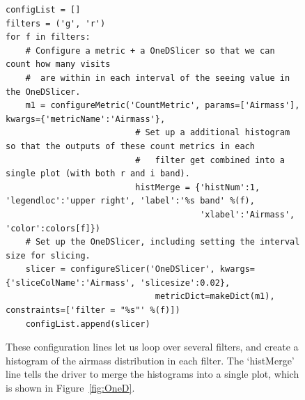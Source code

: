 \documentclass[]{spie}  %
\begin{document}
\begin{figure}
\centering
\begin{lstlisting}[frame=single]
configList = []
filters = ('g', 'r')
for f in filters:
    # Configure a metric + a OneDSlicer so that we can count how many visits 
    #  are within in each interval of the seeing value in the OneDSlicer. 
    m1 = configureMetric('CountMetric', params=['Airmass'], kwargs={'metricName':'Airmass'},
                          # Set up a additional histogram so that the outputs of these count metrics in each
                          #   filter get combined into a single plot (with both r and i band). 
                          histMerge = {'histNum':1, 'legendloc':'upper right', 'label':'%s band' %(f),
                                       'xlabel':'Airmass', 'color':colors[f]})
    # Set up the OneDSlicer, including setting the interval size for slicing.
    slicer = configureSlicer('OneDSlicer', kwargs={'sliceColName':'Airmass', 'slicesize':0.02},
                              metricDict=makeDict(m1), constraints=['filter = "%s"' %(f)])
    configList.append(slicer)
\end{lstlisting}
\caption[]
{\label{fig:oneDdriver}These configuration lines let us loop over
  several filters, and create a histogram of the airmass distribution
  in each filter. The `histMerge' line tells the driver to merge the
  histograms into a single plot, which is shown in Figure~\ref{fig:OneD}.}
\end{figure}
\end{document}
